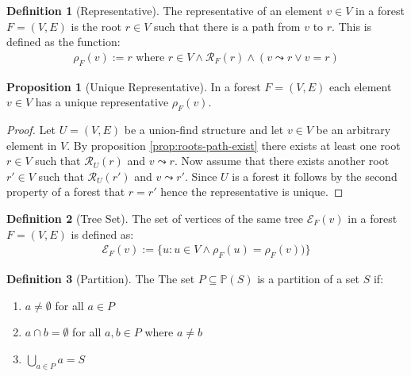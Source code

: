 \documentclass[a4paper,12pt]{article}
\theoremstyle{definition}
\newtheorem{definition}{Definition}[section]
\newtheorem{proposition}{Proposition}[section]
\begin{document}
\begin{definition}[Representative]
    The representative of an element $v \in V$ in a forest $F = (V, E)$ is the
    root $r \in V$ such that there is a path from $v$ to $r$. This is defined as
    the function:
    \begin{align*}
        \rho_F(v) := r \text{ where } r \in V \land \mathcal{R}_F(r) \land (v \leadsto r \lor v = r)
    \end{align*}
\end{definition}

\begin{proposition}[Unique Representative]
    In a forest $F = (V, E)$ each element $v \in V$ has a unique
    representative $\rho_F(v)$.
\end{proposition}

\begin{proof}
    Let $U = (V, E)$ be a union-find structure and let $v \in V$ be an arbitrary
    element in $V$. By proposition \ref{prop:roots-path-exist} there exists at
    least one root $r \in V$ such that $\mathcal{R}_U(r)$ and $v \leadsto r$.
    Now assume that there exists another root $r' \in V$ such that $\mathcal{R}_U(r')$
    and $v \leadsto r'$. Since $U$ is a forest it follows by the second property
    of a forest that $r = r'$ hence the representative is unique.
\end{proof}

\begin{definition}[Tree Set]
    The set of vertices of the same tree $\mathcal{E}_F(v)$ in a
    forest $F = (V, E)$ is defined as:
    \begin{align*}
        \mathcal{E}_F(v) := \{u : u \in V \land \rho_F(u) = \rho_F(v))\}
    \end{align*}
\end{definition}

\begin{definition}[Partition]\label{def:partition} The
    The set $P \subseteq \mathbb{P}(S)$ is a partition of a set $S$ if:
    \begin{enumerate}
        \item $a \neq \emptyset$ for all $a \in P$
        \item $a \cap b = \emptyset$ for all $a, b \in P$ where $a
        \neq b$
        \item $\bigcup_{a \in P} a = S$
    \end{enumerate}
\end{definition}
\end{document}
